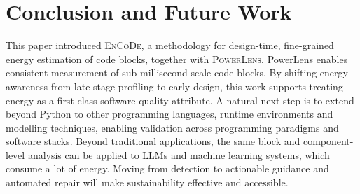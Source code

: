 \section{Conclusion and Future Work}
\label{sec:conclusion}
This paper introduced \textsc{EnCoDe}, a methodology for design-time, fine-grained energy estimation of code blocks, together with \textsc{PowerLens}. PowerLens enables consistent measurement of sub millisecond-scale code blocks. By shifting energy awareness from late-stage profiling to early design, this work supports treating energy as a first-class software quality attribute. A natural next step is to extend beyond Python to other programming languages, runtime environments and modelling techniques, enabling validation across programming paradigms and software stacks. Beyond traditional applications, the same block and component-level analysis can be applied to LLMs and machine learning systems, which consume a lot of energy. Moving from detection to actionable guidance and automated repair will make sustainability effective and accessible.  




